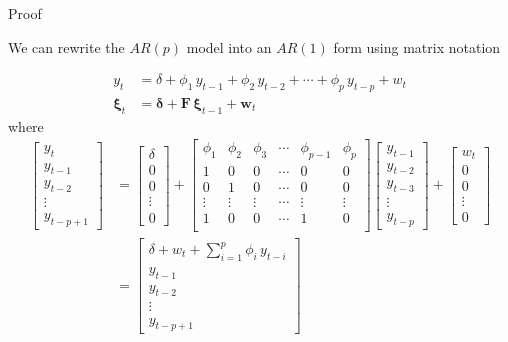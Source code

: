 \documentclass[11pt,ignorenonframetext,]{beamer}
\begin{document}
\begin{frame}{Proof}

We can rewrite the \(AR(p)\) model into an \(AR(1)\) form using matrix
notation

\[
\begin{aligned}
y_t &= \delta + \phi_1 \, y_{t-1} + \phi_2 \, y_{t-2} + \cdots + \phi_p \, y_{t-p} + w_t  \\
\bm\xi_t &= \bm{\delta} + \bm{F} \, \bm\xi_{t-1} + \bm w_t
\end{aligned}
\] where \[
\begin{aligned}
\begin{bmatrix}
y_t \\
y_{t-1} \\
y_{t-2} \\
\vdots \\
y_{t-p+1}
\end{bmatrix} 
&=
\begin{bmatrix}
\delta \\
0 \\
0 \\
\vdots \\
0
\end{bmatrix}
+
\begin{bmatrix}
\phi_1 & \phi_2 & \phi_3 & \cdots & \phi_{p-1} & \phi_p \\
1 & 0 & 0 & \cdots & 0 & 0 \\
0 & 1 & 0 & \cdots & 0 & 0 \\
\vdots & \vdots & \vdots & \cdots & \vdots & \vdots \\
1 & 0 & 0 & \cdots & 1 & 0 \\
\end{bmatrix} 
\begin{bmatrix}
y_{t-1} \\
y_{t-2} \\
y_{t-3} \\
\vdots \\
y_{t-p}
\end{bmatrix} 
+
\begin{bmatrix}
w_t \\
0 \\
0 \\
\vdots \\
0
\end{bmatrix} \\
&=
\begin{bmatrix}
\delta + w_t + \sum_{i=1}^p \phi_i \, y_{t-i} \\
y_{t-1} \\
y_{t-2} \\
\vdots \\
y_{t-p+1}
\end{bmatrix}
\end{aligned}
\]

\end{frame}
\end{document}
